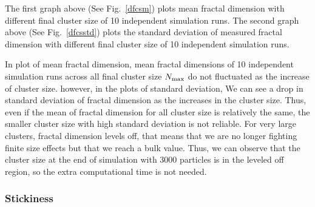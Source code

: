 \documentclass[aps,preprint,groupedaddress,letterpaper]{revtex4-1}
\begin{document}
The first graph above (See Fig.~\ref{dfcsm}) plots mean fractal dimension with different final cluster size of 10 independent simulation runs. The second graph above (See Fig.~\ref{dfcsstd}) plots the standard deviation of measured fractal dimension with different final cluster size of 10 independent simulation runs. 

In plot of mean fractal dimension, mean fractal dimensions of 10 independent simulation runs across all final cluster size $N_{\rm max}$ do not fluctuated as the increase of cluster size. however, in the plots of standard deviation, We can see a drop in standard deviation of fractal dimension as the increases in the cluster size. Thus, even if the mean of fractal dimension for all cluster size is relatively the same, the smaller cluster size with high standard deviation is not reliable. For very large clusters, fractal dimension levels off, that means that we are no longer fighting finite size effects but that we reach a bulk value. Thus, we can observe that the cluster size at the end of simulation with 3000 particles is in the leveled off region, so the extra computational time is not needed.

\subsubsection{Stickiness}
\end{document}
